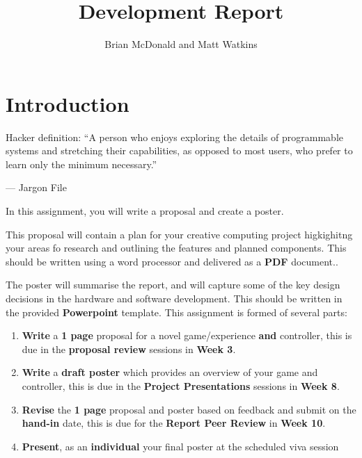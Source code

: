 \documentclass{../../fal_assignment}
\title{Development Report}
\author{Brian McDonald and Matt Watkins}
\begin{document}
\maketitle

\section*{Introduction}

\begin{marginquote}
Hacker definition: ``A person who enjoys exploring the details of programmable systems and stretching their capabilities, as opposed to most users, who prefer to learn only the minimum necessary.''

--- Jargon File

\end{marginquote}

In this assignment, you will write a proposal and create a poster. 

This proposal will contain a plan for your creative computing project higkighitng your areas fo research and outlining the features and planned components.	This should be written using a word processor and delivered as a \textbf{PDF} document..

The poster will summarise the report, and will capture some of the key design decisions in the 
hardware and software development. This should be written in the provided \textbf{Powerpoint} template.
This assignment is formed of several parts:

\begin{enumerate}[label=(\Alph*)]
    \item \textbf{Write} a \textbf{1 page} proposal for a novel game/experience \textbf{and} controller, this is due in the \textbf{proposal review} sessions in \textbf{Week 3}. 
	\item \textbf{Write} a \textbf{draft poster} which provides an overview of your game and controller, this is due in the \textbf{Project Presentations} sessions in \textbf{Week 8}. 
	\item \textbf{Revise} the \textbf{1 page} proposal and poster based on feedback and submit on the \textbf{hand-in} date, this is due for the \textbf{Report Peer Review} in \textbf{Week 10}. 
	\item \textbf{Present}, as an \textbf{individual} your final poster at the scheduled viva session
\end{enumerate}
\end{document}
